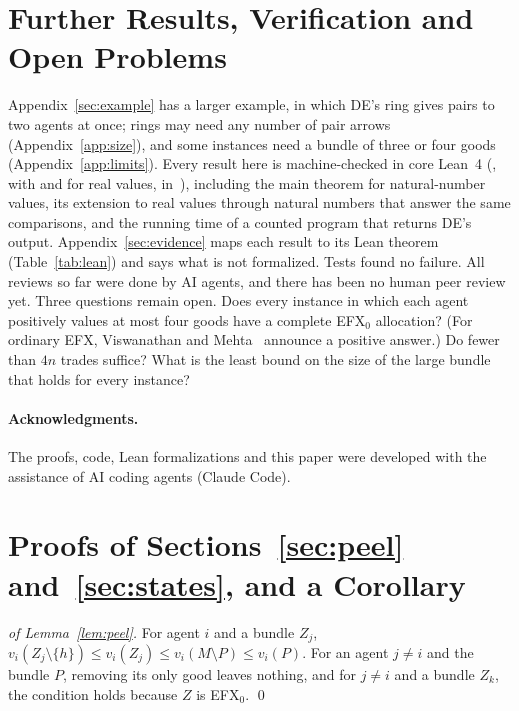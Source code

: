 \documentclass[runningheads,11pt]{llncs}
\newcommand{\efxz}{\texorpdfstring{\mbox{EFX$_0$}}{EFX0}}
\newcommand{\DE}{\textup{DE}}
\begin{document}
\section{Further Results, Verification and Open Problems}\label{sec:concl}

Appendix~\ref{sec:example} has a larger example, in which \DE{}'s ring gives pairs to two agents at once; rings may need any number of pair arrows (Appendix~\ref{app:size}), and some instances need a bundle of three or four goods (Appendix~\ref{app:limits}). Every result here is machine-checked in core Lean~4 (, with  and  for real values, in~\cite{Repo}), including the main theorem for natural-number values, its extension to real values through natural numbers that answer the same comparisons, and the running time of a counted program that returns \DE{}'s output. Appendix~\ref{sec:evidence} maps each result to its Lean theorem (Table~\ref{tab:lean}) and says what is not formalized. Tests found no failure. All reviews so far were done by AI agents, and there has been no human peer review yet. Three questions remain open. Does every instance in which each agent positively values at most four goods have a complete \efxz{} allocation? (For ordinary EFX, Viswanathan and Mehta~\cite{ViswanathanM24} announce a positive answer.) Do fewer than $4n$ trades suffice? What is the least bound on the size of the large bundle that holds for every instance?

\paragraph{Acknowledgments.} The proofs, code, Lean formalizations and this paper were developed with the assistance of AI coding agents (Claude Code).




\appendix

\section{Proofs of Sections~\ref{sec:peel} and~\ref{sec:states}, and a Corollary}\label{app:proofs}

\begin{proof}[of Lemma~\ref{lem:peel}]
For agent $i$ and a bundle $Z_j$, $v_i(Z_j\setminus\{h\})\le v_i(Z_j)\le v_i(M\setminus P)\le v_i(P)$. For an agent $j\ne i$ and the bundle $P$, removing its only good leaves nothing, and for $j\ne i$ and a bundle $Z_k$, the condition holds because $Z$ is \efxz{}. \qed
\end{proof}
\end{document}
